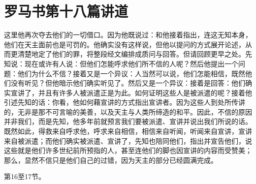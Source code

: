 
\section{罗马书第十八篇讲道}

\par

\par

这里他再次夺去他们的一切借口。因为他既说过：和他接着指出，连这无知本身，他们在天主面前也是可罚的。他确实没有这样说，但他以提问的方式展开论述，从而更清楚地定了他们的罪，将整段经文编排成质问与回答。但请回顾更早之处。先知说：现在或许有人说：但他们怎能呼求他们所不信的人呢？然后他提出一个问题：他们为什么不信？接着又是一个异议：人当然可以说，他们怎能相信，既然他们没有听见？但他暗示他们确实听见了。然后又是一个异议：接着是回答：他们确实宣讲了，并且有许多人被派遣正是为此。如何证明这些人是被派遣的呢？接着他引述先知的话：你看，他如何藉宣讲的方式指出宣讲者。因为这些人到处所传讲的，无非是那不可言喻的美善，以及天主与人类所缔造的和平。因此，不信的原因并非我们，而是先知，他多年前就预言我们要被派遣、宣讲并说出我们所说的话。既然如此，得救来自呼求他，呼求来自相信，相信来自听闻，听闻来自宣讲，宣讲来自被派遣；而他们确实被派遣、宣讲了，先知也陪同他们，指出并宣告他们，说这些就是他们许多世纪前所预指的人，甚至连他们的脚也因宣讲的内容而受赞美；那么，显然不信只是他们自己的过错，因为天主的部分已经圆满完成。\par

第16至17节。\par

